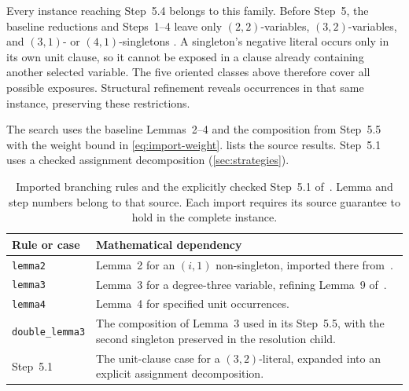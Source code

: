 \documentclass[10pt,twoside]{article}
\theoremstyle{definition}
\theoremstyle{remark}
\begin{document}
Every instance reaching Step~5.4 belongs to this family. Before Step~5,
the baseline reductions and Steps~1--4 leave only $(2,2)$-variables,
$(3,2)$-variables, and $(3,1)$- or $(4,1)$-singletons
\cite[Section~4.6]{Xiao2022}. A singleton's negative literal occurs only in
its own unit clause, so it cannot be exposed in a clause already containing
another selected variable. The five oriented classes above therefore cover
all possible exposures. Structural refinement reveals occurrences in that
same instance, preserving these restrictions.

The search uses the baseline Lemmas~2--4 and the composition from Step~5.5
with the weight bound in \cref{eq:import-weight}. 
lists the source results. Step~5.1 uses a checked assignment decomposition
(\cref{sec:strategies}).

\begin{table}[!htbp]
\centering\small
\begin{tabularx}{\linewidth}{@{}lX@{}}
\toprule
Rule or case & Mathematical dependency \\
\midrule
\texttt{lemma2} & Lemma~2 for an $(i,1)$ non-singleton,
imported there from~\cite{XuEtAl2019}. \\
\texttt{lemma3} & Lemma~3 for a degree-three variable,
refining Lemma~9 of~\cite{XuEtAl2019}. \\
\texttt{lemma4} & Lemma~4 for specified unit occurrences. \\
\texttt{double\_lemma3} & The composition of Lemma~3
used in its Step~5.5,
with the second singleton preserved in the resolution child. \\
Step~5.1 & The unit-clause case for a $(3,2)$-literal,
expanded into an explicit assignment decomposition. \\
\bottomrule
\end{tabularx}
\caption{Imported branching rules and the explicitly checked Step~5.1
of~\cite{Xiao2022}. Lemma and step numbers belong to that source.
Each import requires its source guarantee to hold in the complete instance.}
\label{tab:dependencies}
\end{table}
\end{document}
